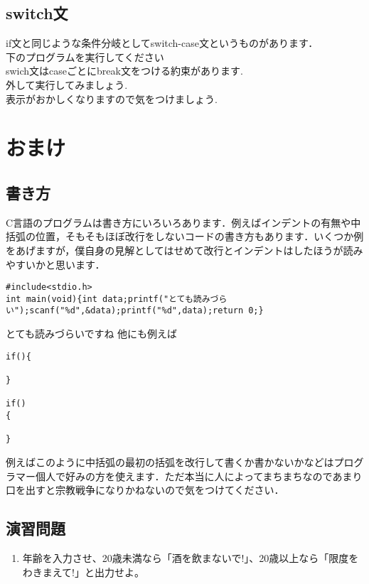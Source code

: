 \documentclass[a4j,titlepage,dvipdfmx]{jsarticle}   %
\begin{document}
\subsection{switch文}
if文と同じような条件分岐としてswitch-case文というものがあります．\\
下のプログラムを実行してください\\

swich文はcaseごとにbreak文をつける約束があります.\\
外して実行してみましょう.\\
表示がおかしくなりますので気をつけましょう.\\
\section{おまけ}
\subsection{書き方}
C言語のプログラムは書き方にいろいろあります．例えばインデントの有無や中括弧の位置，そもそもほぼ改行をしないコードの書き方もあります．いくつか例をあげますが，僕自身の見解としてはせめて改行とインデントはしたほうが読みやすいかと思います．
\begin{lstlisting}
#include<stdio.h>
int main(void){int data;printf("とても読みづらい");scanf("%d",&data);printf("%d",data);return 0;}
\end{lstlisting}
とても読みづらいですね
他にも例えば
\begin{lstlisting}
if(){

}

if()
{

}
\end{lstlisting}
例えばこのように中括弧の最初の括弧を改行して書くか書かないかなどはプログラマー個人で好みの方を使えます．ただ本当に人によってまちまちなのであまり口を出すと宗教戦争になりかねないので気をつけてください．

\subsection{演習問題}
\begin{enumerate}
	\item 年齢を入力させ、20歳未満なら「酒を飲まないで!」、20歳以上なら「限度をわきまえて!」と出力せよ。
\end{enumerate}
\end{document}
